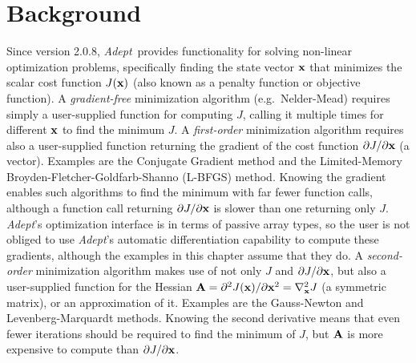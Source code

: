 \documentclass[a4,oneside]{book}
\def\Adept{\emph{Adept}}
\begin{document}
\section{Background}
\label{sec:optimize}
Since version 2.0.8, \Adept\ provides functionality for solving
non-linear optimization problems, specifically finding the state
vector ${\bf x}$ that minimizes the scalar cost function $J({\bf
  x})$ (also known as a penalty function or objective function).
%
A \emph{gradient-free} minimization algorithm (e.g.\ Nelder-Mead)
requires simply a user-supplied function for computing $J$, calling it
multiple times for different ${\bf x}$ to find the minimum $J$.
%
A \emph{first-order} minimization algorithm requires also a
user-supplied function returning the gradient of the cost function
$\partial J/{\partial\bf x}$ (a vector). Examples are the Conjugate Gradient
method and the Limited-Memory Broyden-Fletcher-Goldfarb-Shanno
(L-BFGS) method. Knowing the gradient enables such algorithms to find
the minimum with far fewer function calls, although a function call
returning $\partial J/{\partial\bf x}$ is slower than one returning only
$J$. \Adept's optimization interface is in terms of passive array
types, so the user is not obliged to use \Adept's automatic
differentiation capability to compute these gradients, although the
examples in this chapter assume that they do.
%
A \emph{second-order} minimization algorithm makes use of not only $J$
and $\partial J/{\partial\bf x}$, but also a user-supplied function for the
Hessian ${\bf A}=\partial^2J({\bf x})/\partial{\bf x}^2=\nabla_{\bf
  x}^2J$ (a symmetric matrix), or an approximation of it.  Examples
are the Gauss-Newton and Levenberg-Marquardt methods. Knowing the
second derivative means that even fewer iterations should be required
to find the minimum of $J$, but ${\bf A}$ is more expensive to compute
than $\partial J/{\partial\bf x}$.
\end{document}
